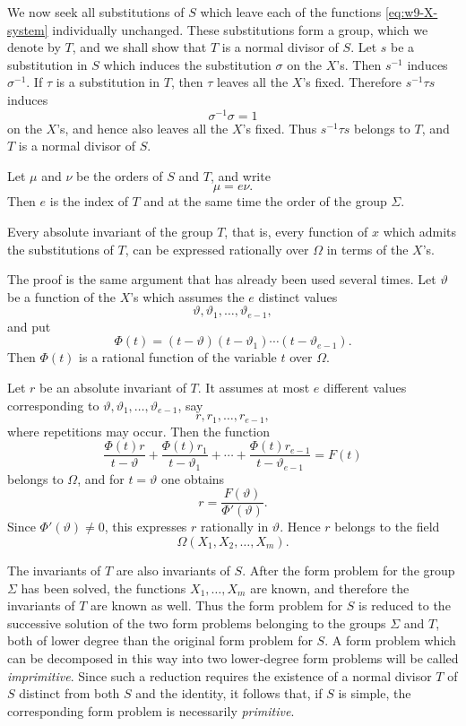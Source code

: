 \documentclass[11pt]{article}
\begin{document}
We now seek all substitutions of $S$ which leave each of the functions \eqref{eq:w9-X-system} individually unchanged.  These substitutions form a group, which we denote by $T$, and we shall show that $T$ is a normal divisor of $S$.  Let $s$ be a substitution in $S$ which induces the substitution $\sigma$ on the $X$'s.  Then $s^{-1}$ induces $\sigma^{-1}$.  If $\tau$ is a substitution in $T$, then $\tau$ leaves all the $X$'s fixed.  Therefore $s^{-1}\tau s$ induces
\[
 \sigma^{-1}\sigma=1
\]
on the $X$'s, and hence also leaves all the $X$'s fixed.  Thus $s^{-1}\tau s$ belongs to $T$, and $T$ is a normal divisor of $S$.

Let $\mu$ and $\nu$ be the orders of $S$ and $T$, and write
\[
 \mu=e\nu.
\]
Then $e$ is the index of $T$ and at the same time the order of the group $\Sigma$.

Every absolute invariant of the group $T$, that is, every function of $x$ which admits the substitutions of $T$, can be expressed rationally over $\Omega$ in terms of the $X$'s.

The proof is the same argument that has already been used several times.  Let $\vartheta$ be a function of the $X$'s which assumes the $e$ distinct values
\[
 \vartheta,\vartheta_1,\ldots,\vartheta_{e-1},
\]
and put
\begin{equation}\label{eq:w9-Phi-t}
 \Phi(t)=(t-\vartheta)(t-\vartheta_1)\cdots(t-\vartheta_{e-1}).
\end{equation}
Then $\Phi(t)$ is a rational function of the variable $t$ over $\Omega$.

Let $r$ be an absolute invariant of $T$.  It assumes at most $e$ different values corresponding to $\vartheta,\vartheta_1,\ldots,\vartheta_{e-1}$, say
\[
 r,r_1,\ldots,r_{e-1},
\]
where repetitions may occur.  Then the function
\[
 \frac{\Phi(t)r}{t-\vartheta}
 +\frac{\Phi(t)r_1}{t-\vartheta_1}
 +\cdots+
 \frac{\Phi(t)r_{e-1}}{t-\vartheta_{e-1}}
 =F(t)
\]
belongs to $\Omega$, and for $t=\vartheta$ one obtains
\[
 r=\frac{F(\vartheta)}{\Phi'(\vartheta)}.
\]
Since $\Phi'(\vartheta)\ne0$, this expresses $r$ rationally in $\vartheta$.  Hence $r$ belongs to the field
\[
 \Omega(X_1,X_2,\ldots,X_m).
\]

The invariants of $T$ are also invariants of $S$.  After the form problem for the group $\Sigma$ has been solved, the functions $X_1,\ldots,X_m$ are known, and therefore the invariants of $T$ are known as well.  Thus the form problem for $S$ is reduced to the successive solution of the two form problems belonging to the groups $\Sigma$ and $T$, both of lower degree than the original form problem for $S$.  A form problem which can be decomposed in this way into two lower-degree form problems will be called \emph{imprimitive}.  Since such a reduction requires the existence of a normal divisor $T$ of $S$ distinct from both $S$ and the identity, it follows that, if $S$ is simple, the corresponding form problem is necessarily \emph{primitive}.
\end{document}
